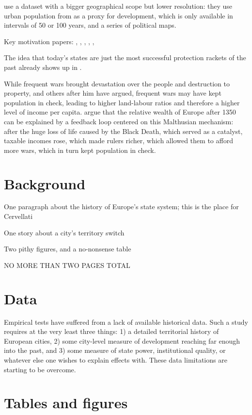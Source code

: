 \documentclass{article}
\begin{document}
\cite{schoenholzer2022} use a dataset with a bigger geographical scope but lower resolution: they use urban population from \cite{bairoch1988} as a proxy for development, which is only available in intervals of 50 or 100 years, and a series of political maps. 




Key motivation papers: \cite{levine2013, levine2021}, \cite{diamond1997}, \cite{schoenholzer2022}, \cite{cervellati2022}, \cite{voigtlnder2013}, \cite{tilly1985}

The idea that today's states are just the most successful protection rackets of the past already shows up in \cite{tilly1985}.

While frequent wars brought devastation over the people and destruction to property, \cite{malthus1798} and others after him have argued, frequent wars may have kept population in check, leading to higher land-labour ratios and therefore a higher level of income per capita. \cite{voigtlnder2013} argue that the relative wealth of Europe after 1350 can be explained by a feedback loop centered on this Malthusian mechanism: after the huge loss of life caused by the Black Death, which served as a catalyst, taxable incomes rose, which made rulers richer, which allowed them to afford more wars, which in turn kept population in check.


\section{Background}


One paragraph about the history of Europe's state system; this is the place for Cervellati

One story about a city's territory switch

Two pithy figures, and a no-nonsense table

NO MORE THAN TWO PAGES TOTAL


\section{Data}

Empirical tests have suffered from a lack of available historical data. Such a study requires at the very least three things: 1) a detailed territorial history of European cities, 2) some city-level measure of development reaching far enough into the past, and 3) some measure of state power, institutional quality, or whatever else one wishes to explain effects with. These data limitations are starting to be overcome. 




\newpage
\onehalfspacing



\newpage
\section*{Tables and figures}
\end{document}
